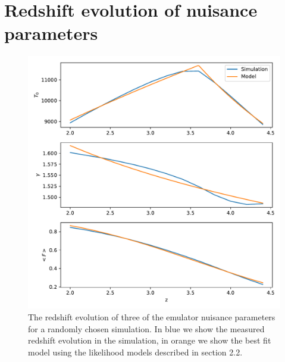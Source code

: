 \documentclass[]{article}
\begin{document}
\section{Redshift evolution of nuisance parameters}
\begin{figure}[h]
    \centering
    \includegraphics[scale=0.7]{Figures/512_sim2.pdf}
    \caption{The redshift evolution of three of the emulator nuisance parameters for a 
    randomly chosen simulation. In blue we show the measured redshift evolution in the 
    simulation, in orange we show the best fit model using the likelihood models 
    described in section 2.2.}
\end{figure}
\end{document}

